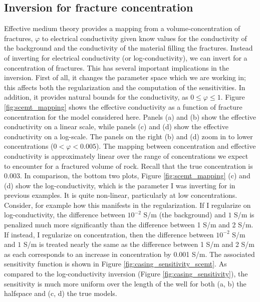\subsection{Inversion for fracture concentration}
Effective medium theory provides a mapping from a volume-concentration of fractures, $\varphi$ to electrical conductivity given know values for the conductivity of the background and the conductivity of the material filling the fractures. Instead of inverting for electrical conductivity (or log-conductivity), we can invert for a concentration of fractures. This has several important implications in the inversion. First of all, it changes the parameter space which we are working in; this affects both the regularization and the computation of the sensitivities. In addition, it provides natural bounds for the conductivity, as $0 \leq \varphi \leq 1$. Figure \ref{fig:scemt_mapping} shows the effective conductivity as a function of fracture concentration for the model considered here. Panels (a) and (b) show the effective conductivity on a linear scale, while panels (c) and (d) show the effective conductivity on a log-scale. The panels on the right (b) and (d) zoom in to lower concentrations ($0 < \varphi < 0.005$). The mapping between concentration and effective conductivity is approximately linear over the range of concentrations we expect to encounter for a fractured volume of rock. Recall that the true concentration is 0.003. In comparison, the bottom two plots, Figure \ref{fig:scemt_mapping} (c) and (d) show the log-conductivity, which is the parameter I was inverting for in previous examples. It is quite non-linear, particularly at low concentrations. Consider, for example how this manifests in the regularization. If I regularize on log-conductivity, the difference between $10^{-2}$ S/m (the background) and $1$ S/m is penalized much more significantly than the difference between 1 S/m and 2 S/m. If instead, I regularize on concentration, then the difference between $10^{-2}$ S/m and $1$ S/m is treated nearly the same as the difference between 1 S/m and 2 S/m as each corresponds to an increase in concentration by 0.001 S/m. The associated sensitivity function is shown in Figure \ref{fig:casing_sensitivity_scemt}. As compared to the log-conductivity inversion (Figure \ref{fig:casing_sensitivity}), the sensitivity is much more uniform over the length of the well for both (a, b) the halfspace and (c, d) the true models.






